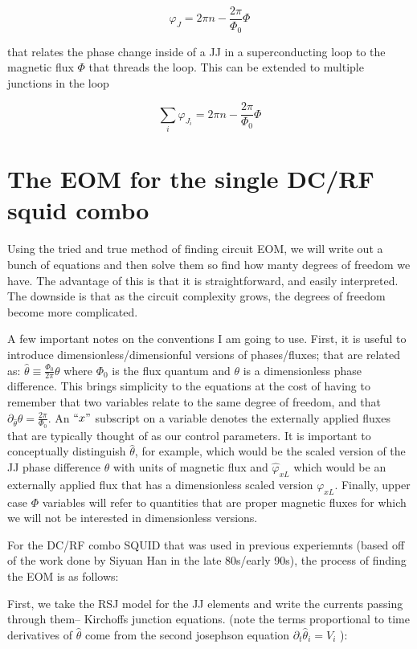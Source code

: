 \documentclass[paper=a4, twocolumn, fontsize=10pt]{article} %
\numberwithin{equation}{section} %
\numberwithin{figure}{section} %
\numberwithin{table}{section} %
\def \df#1{\hat{#1}}
\begin{document}
\[ \varphi_J = 2\pi n - \frac{2\pi}{\Phi_0} \Phi \]

that relates the phase change inside of a JJ in a superconducting loop to the magnetic flux $\Phi$ that threads the loop. This can be extended to multiple junctions in the loop

\[ \sum_i \varphi_{J_i} = 2\pi n - \frac{2\pi}{\Phi_0} \Phi \]


\section{The EOM for the single DC/RF squid combo}

Using the tried and true method of finding circuit EOM, we will write out a bunch of equations and then solve them so find how manty degrees of freedom we have. The advantage of this is that it is straightforward, and easily interpreted. The downside is that as the circuit complexity grows, the degrees of freedom become more complicated.

A few important notes on the conventions I am going to use. First, it is useful to introduce dimensionless/dimensionful versions of phases/fluxes; that are related as: $ \df \theta \equiv  \frac{\Phi_0}{2\pi} \theta  $ where $\Phi_0$ is the flux quantum and $\theta$ is a dimensionless phase difference. This brings simplicity to the equations at the cost of having to remember that two variables relate to the same degree of freedom, and that $ \partial_{\df \theta} {\theta} = \frac{2\pi}{\Phi_0}$. An $``x"$ subscript on a variable denotes the externally applied fluxes that are typically thought of as our control parameters. It is important to conceptually distinguish $\df\theta$, for example, which would be the scaled version of the JJ phase difference $\theta$ with units of magnetic flux and  $\df\varphi_{xL}$ which would be an externally applied flux that has a dimensionless scaled version $\varphi_{xL}$. Finally, upper case $\Phi$ variables will refer to quantities that are proper magnetic fluxes for which we will not be interested in dimensionless versions.


For the DC/RF combo SQUID that was used in previous experiemnts (based off of the work done by Siyuan Han in the late 80s/early 90s), the process of finding the EOM is as follows:

First, we take the RSJ model for the JJ elements and write the currents passing through them-- Kirchoffs junction equations. (note the terms proportional to time derivatives of $\df \theta$ come from the second josephson equation $\partial_t \df \theta_i =  V_i $ ):
\end{document}

